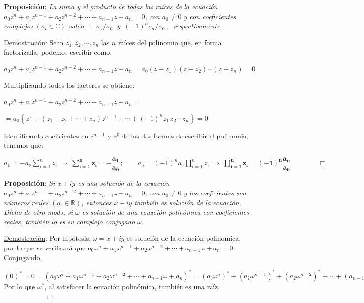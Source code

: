 \vspace{5mm}
\begin{theorem}

\textbf{Proposición}: \emph{	La suma y el producto de todas las raíces de la ecuación $a_0z^n+a_1z^{n-1}+a_2z^{n-2}+\cdots +a_{n-1}z+a_n=0$, con $a_0\neq 0$ y con coeficientes complejos $(a_i\in \mathbb C)$ valen $\ -a_1/a_0\ $ y $\ (-1)^na_n/a_0\, , \ $ respectivamente.}
\end{theorem}
\underline{Demostración}: Sean $z_1, z_2, \cdots, z_n$ las $n$ raíces del polinomio que, en forma factorizada, podemos  escribir como:

$a_0z^n+a_1z^{n-1}+a_2z^{n-2}+\cdots +a_{n-1}z+a_n=a_0(z-z_1)(z-z_2) \cdots (z-z_n)=0$

Multiplicando todos los factores se obtiene: 

$a_0z^n+a_1z^{n-1}+a_2z^{n-2}+\cdots +a_{n-1}z+a_n=$

\hspace{4cm} $=a_0 \left\{ z^n - (z_1+z_2+ \cdots + z_n) z^{n-1}+ \cdots + (-1)^n z_1\, z_2\, \cdots z_n \right\} = 0$

Identificando coeficientes en $z^{n-1}$ y $z^0$ de las dos formas de escribir el polinomio, tenemos que:

$a_1=-a_0\displaystyle \sum_{i=1}^nz_i \ \Rightarrow \ \boldsymbol{ \sum_{i=1}^n z_i = -\dfrac{a_1}{a_0} } \, ; \qquad  a_n=(-1)^n a_0 \prod_{i=1}^n
z_i \ \Rightarrow \ \boldsymbol{ \prod_{i=1}^n z_i=(-1)^n \dfrac{a_n}{a_0} } \qquad \qquad \Box$ 

\vspace{5mm}
\begin{theorem}

\textbf{Proposición}:	\emph{Si $x+iy$ es una solución de la ecuación $a_0z^n+a_1z^{n-1}+a_2z^{n-2}+\cdots +a_{n-1}z+a_n=0$, con $a_0\neq 0$ y los coeficientes son números reales $(a_i\in \mathbb R)$, entonces $x-iy$ también es solución de la ecuación. Dicho de otro modo, si $\omega$ es solución de una ecuación polinómica con coeficientes reales, también lo es su complejo conjugado $\overline{\omega}$.}
\end{theorem}
\underline{Demostración}: Por hipótesis, $\omega=x+iy$ es solución de la ecuación polinómica, por lo que se verificará que
$a_0 \omega^n + a_1 \omega^{n-1}+a_2 \omega^{n-2}+\cdots +a_{n-1} \omega+a_n=0$. Conjugando,

$(0)^*=0=(a_0 \omega^n + a_1 \omega^{n-1}+a_2 \omega^{n-2}+\cdots +a_{n-1} \omega+a_n)^*=
(a_0 \omega^n)^* + (a_1 \omega^{n-1})^*+(a_2 \omega^{n-2})^*+\cdots +(a_{n-1} \omega)^*+(a_n)^* =\  \left[ a_i^*=a_i,\ a_i\in \mathbb R \right] \ =
a_0 (\omega^*)^n + a_1 (\omega^*)^{n-1}+a_2 (\omega^*)^{n-2}+\cdots +a_{n-1} (\omega)^*+a_n$
Por lo que $\omega^*$, al satisfacer la ecuación polinómica, también es una raíz. $\qquad \qquad \qquad \Box$

